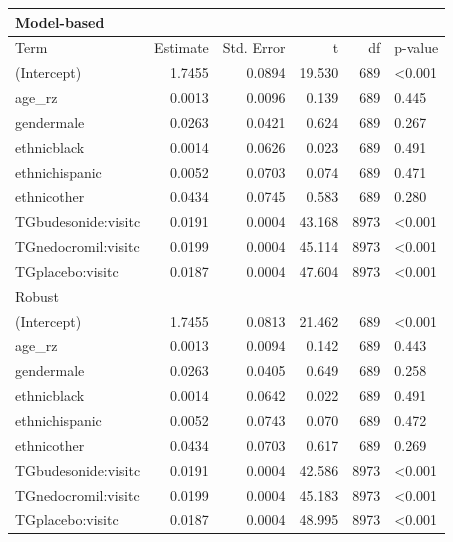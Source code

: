 \begin{tabular}{lrrrrl}
\hline
\multicolumn{6}{l}{Model-based} \\
\hline
Term & Estimate & Std. Error & t & df & p-value \\
\hline
(Intercept) & 1.7455 & 0.0894 & 19.530 & 689 & <0.001 \\
age\_rz & 0.0013 & 0.0096 & 0.139 & 689 & 0.445 \\
gendermale & 0.0263 & 0.0421 & 0.624 & 689 & 0.267 \\
ethnicblack & 0.0014 & 0.0626 & 0.023 & 689 & 0.491 \\
ethnichispanic & 0.0052 & 0.0703 & 0.074 & 689 & 0.471 \\
ethnicother & 0.0434 & 0.0745 & 0.583 & 689 & 0.280 \\
TGbudesonide:visitc & 0.0191 & 0.0004 & 43.168 & 8973 & <0.001 \\
TGnedocromil:visitc & 0.0199 & 0.0004 & 45.114 & 8973 & <0.001 \\
TGplacebo:visitc & 0.0187 & 0.0004 & 47.604 & 8973 & <0.001 \\
\hline
\multicolumn{6}{l}{Robust} \\
\hline
(Intercept) & 1.7455 & 0.0813 & 21.462 & 689 & <0.001 \\
age\_rz & 0.0013 & 0.0094 & 0.142 & 689 & 0.443 \\
gendermale & 0.0263 & 0.0405 & 0.649 & 689 & 0.258 \\
ethnicblack & 0.0014 & 0.0642 & 0.022 & 689 & 0.491 \\
ethnichispanic & 0.0052 & 0.0743 & 0.070 & 689 & 0.472 \\
ethnicother & 0.0434 & 0.0703 & 0.617 & 689 & 0.269 \\
TGbudesonide:visitc & 0.0191 & 0.0004 & 42.586 & 8973 & <0.001 \\
TGnedocromil:visitc & 0.0199 & 0.0004 & 45.183 & 8973 & <0.001 \\
TGplacebo:visitc & 0.0187 & 0.0004 & 48.995 & 8973 & <0.001 \\
\hline
\end{tabular}
